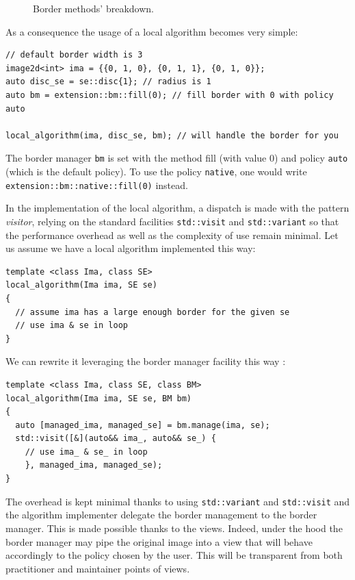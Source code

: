 \begin{figure}[htbp]
  \centering
  \hfil
  \hfil
  \hfil
  \hfil
  \hfil

  \caption{Border methods' breakdown.}
  \label{fig:border.all}
\end{figure}

As a consequence the usage of a local algorithm becomes very simple:

\begin{verbatim}
// default border width is 3
image2d<int> ima = {{0, 1, 0}, {0, 1, 1}, {0, 1, 0}};
auto disc_se = se::disc{1}; // radius is 1
auto bm = extension::bm::fill(0); // fill border with 0 with policy auto

local_algorithm(ima, disc_se, bm); // will handle the border for you
\end{verbatim}

The border manager \texttt{bm} is set with the method fill (with value 0) and policy \texttt{auto} (which is the default
policy). To use the policy \texttt{native}, one would write \texttt{extension::bm::native::fill(0)} instead.

In the implementation of the local algorithm, a dispatch is made with the pattern \emph{visitor}, relying on the
standard facilities \texttt{std::visit} and \texttt{std::variant} so that the performance overhead as well as the
complexity of use remain minimal. Let us assume we have a local algorithm implemented this way:
\begin{verbatim}
template <class Ima, class SE>
local_algorithm(Ima ima, SE se)
{
  // assume ima has a large enough border for the given se
  // use ima & se in loop
}
\end{verbatim}
We can rewrite it leveraging the border manager facility this way :
\begin{verbatim}
template <class Ima, class SE, class BM>
local_algorithm(Ima ima, SE se, BM bm)
{
  auto [managed_ima, managed_se] = bm.manage(ima, se);
  std::visit([&](auto&& ima_, auto&& se_) {
    // use ima_ & se_ in loop
    }, managed_ima, managed_se);
}
\end{verbatim}
The overhead is kept minimal thanks to using \texttt{std::variant} and \texttt{std::visit} and the algorithm implementer
delegate the border management to the border manager. This is made possible thanks to the views. Indeed, under the hood
the border manager may pipe the original image into a view that will behave accordingly to the policy chosen by the
user. This will be transparent from both practitioner and maintainer points of views.


